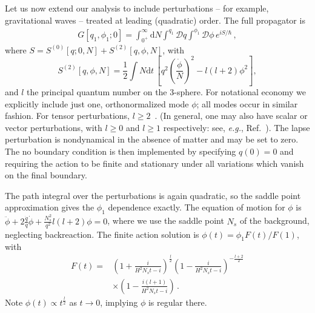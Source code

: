 \documentclass[twocolumn,amsmath,amssymb,superscriptaddress,nofootinbib]{revtex4-1}
\begin{document}
Let us now extend our analysis to include perturbations -- for example, gravitational waves -- treated at leading (quadratic) order. The full propagator is
\begin{align}
G[q_1,\phi_1;0] = \int_{0^+}^\infty \mathrm{d}N \int ^{q_1}\mathcal{D}q\int^{\phi_1} \mathcal{D}\phi\, e^{i S/\hbar}\,,\nonumber
\end{align} 
where $S=S^{(0)}[q;0,N]+S^{(2)}[q,\phi,N]$, with 
\begin{equation}
S^{(2)}[q,\phi,N]=\frac{1}{2} \int N\mathrm{d}t\,\left[ q^2 \left(\frac{\dot{\phi}}{N}\right)^2 -  l(l+2) \phi^2\right],\nonumber
\end{equation}
and $l$ the principal quantum number on the 3-sphere. For notational economy we explicitly include just one, orthonormalized mode $\phi$; all modes occur in similar fashion.  For tensor perturbations, $l\geq 2$~\cite{Gerlach:1978gy}. (In general, one may also have scalar or vector perturbations, with $l\geq0$ and $l\geq 1$ respectively: see, {\it e.g.}, Ref.~\cite{Gratton:2001gw}).  The lapse perturbation is nondynamical in the absence of matter and may be set to zero. The no boundary condition is then implemented by specifying $q(0)=0$ and requiring the action to be finite and stationary under all variations which vanish on the final boundary. 

The path integral over the perturbations is again quadratic, so the saddle point approximation gives the $\phi_1$ dependence exactly. The equation of motion for $\phi$ is $
\ddot{\phi} + 2\frac{\dot{q}}{q} \dot{\phi} + \frac{N_s^2}{q^2}l(l+2) \phi = 0$, where we use the saddle point $N_s$ of the background, neglecting backreaction. The finite action solution is
$\phi(t) = \phi_1 F(t)/F(1) $, with 
\begin{align}
F(t) =& \left( 1 + \frac{i}{H^2 N_s t - i}\right)^{\frac{l}{2}} \left( 1 - \frac{i}{H^2 N_s t - i}\right)^{-\frac{l+2}{2}} \nonumber \\ & \times \left( 1 - \frac{i(l+1)}{H^2 N_s t - i}\right) \,. \label{eq:F}
\end{align}
Note $\phi(t) \propto t^{\frac{l}{2}}$ as $t\rightarrow 0$, implying $\phi$ is regular there. 
\end{document}
